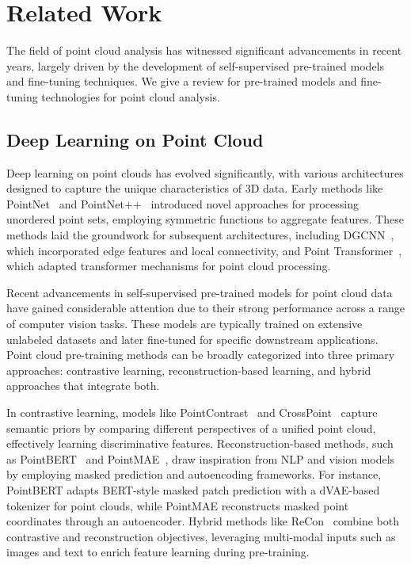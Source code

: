 \section{Related Work}
\label{sec:relatedwork}
The field of point cloud analysis has witnessed significant advancements in recent years, largely driven by the development of self-supervised pre-trained models and fine-tuning techniques. We give a review for pre-trained models and fine-tuning technologies for point cloud analysis.

\subsection{Deep Learning on Point Cloud}

Deep learning on point clouds has evolved significantly, with various architectures designed to capture the unique characteristics of 3D data. Early methods like PointNet~\cite{qi2017pointnet} and PointNet++~\cite{qi2017pointnet++} introduced novel approaches for processing unordered point sets, employing symmetric functions to aggregate features. These methods laid the groundwork for subsequent architectures, including DGCNN~\cite{wang2019dynamic}, which incorporated edge features and local connectivity, and Point Transformer~\cite{zhao2021point}, which adapted transformer mechanisms for point cloud processing.

Recent advancements in self-supervised pre-trained models for point cloud data have gained considerable attention due to their strong performance across a range of computer vision tasks. These models are typically trained on extensive unlabeled datasets and later fine-tuned for specific downstream applications. Point cloud pre-training methods can be broadly categorized into three primary approaches: contrastive learning, reconstruction-based learning, and hybrid approaches that integrate both.

In contrastive learning, models like PointContrast~\cite{xie2020pointcontrast} and CrossPoint~\cite{afham2022crosspoint} capture semantic priors by comparing different perspectives of a unified point cloud, effectively learning discriminative features. Reconstruction-based methods, such as PointBERT~\cite{yu2022point} and PointMAE~\cite{pang2022masked}, draw inspiration from NLP and vision models by employing masked prediction and autoencoding frameworks. For instance, PointBERT adapts BERT-style masked patch prediction with a dVAE-based tokenizer for point clouds, while PointMAE reconstructs masked point coordinates through an autoencoder. Hybrid methods like ReCon~\cite{qi2023contrast} combine both contrastive and reconstruction objectives, leveraging multi-modal inputs such as images and text to enrich feature learning during pre-training.

